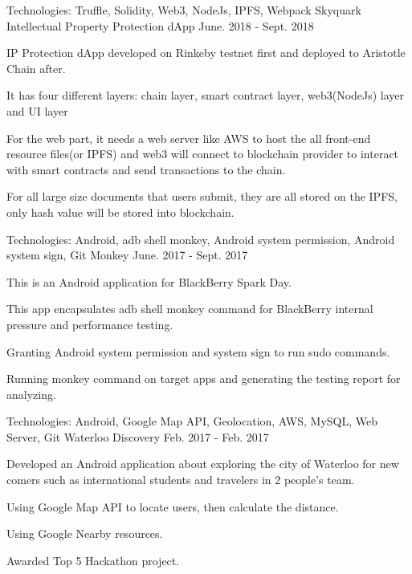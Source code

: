 \begin{cventries}
 
  \cventry
    {Technologies: \quad Truffle, Solidity, Web3, NodeJs, IPFS, Webpack
    }
    {Skyquark Intellectual Property Protection dApp}
    {}
    {June. 2018 - Sept. 2018}
    {
      \begin{cvitems}
        \item {IP Protection dApp developed on Rinkeby testnet first and deployed to Aristotle Chain after.}
        \item {It has four different layers: chain layer, smart contract layer, web3(NodeJs) layer and UI layer}
        \item {For the web part, it needs a web server like AWS to host the all front-end resource files(or IPFS) and web3 will connect to blockchain provider to interact with smart contracts and send transactions to the chain.}
        \item {For all large size documents that users submit, they are all stored on the IPFS, only hash value will be stored into blockchain.}
      \end{cvitems}
    }

  \cventry
    {Technologies: \quad Android, adb shell monkey, Android system permission, Android system sign, Git}
    {Monkey}
    {}
    {June. 2017 - Sept. 2017}
    {
      \begin{cvitems}
        \item {This is an Android application for BlackBerry Spark Day.}
        \item {This app encapsulates adb shell monkey command for BlackBerry internal pressure and performance testing.}
        \item {Granting Android system permission and system sign to run sudo commands.}
        \item {Running monkey command on target apps and generating the testing report for analyzing.}
      \end{cvitems}
    }
  
  \cventry
    {Technologies: \quad Android, Google Map API, Geolocation, AWS, MySQL, Web Server, Git}
    {Waterloo Discovery}
    {}
    {Feb. 2017 - Feb. 2017}
    {
      \begin{cvitems}
        \item {Developed an Android application about exploring the city of Waterloo for new comers such as international students and travelers in 2 people's team.}
        \item {Using Google Map API to locate users, then calculate the distance.}
        \item {Using Google Nearby resources.}
        \item {Awarded Top 5 Hackathon project.}
      \end{cvitems}
    }
    

\end{cventries}
